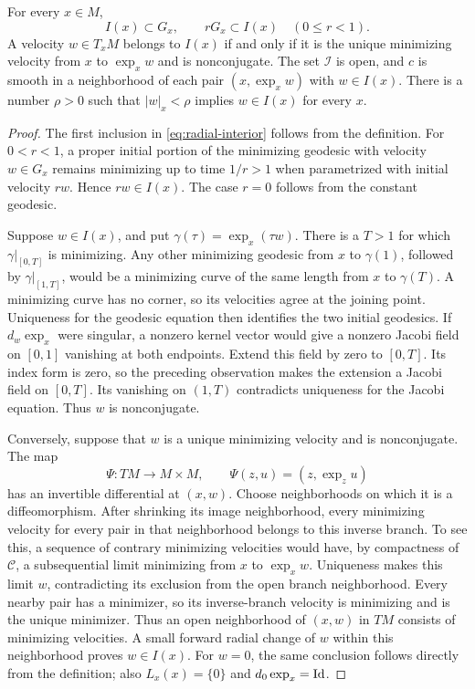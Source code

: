 \begin{lemma}
\label{lem:interior-characterization}
For every $x\in M$,
\begin{equation}
 I(x)\subset G_x,\qquad rG_x\subset I(x)\quad(0\leq r<1).
 \label{eq:radial-interior}
\end{equation}
A velocity $w\in T_xM$ belongs to $I(x)$ if and only if it is the
unique minimizing velocity from $x$ to $\exp_x w$ and is nonconjugate.
The set $\mathcal I$ is open, and $c$ is smooth in a neighborhood of
each pair $(x,\exp_x w)$ with $w\in I(x)$.  There is a number
$\rho>0$ such that $|w|_x<\rho$ implies $w\in I(x)$ for every $x$.
\end{lemma}

\begin{proof}
The first inclusion in \eqref{eq:radial-interior} follows from the
definition.  For $0<r<1$, a proper initial portion of the minimizing
geodesic with velocity $w\in G_x$ remains minimizing up to time
$1/r>1$ when parametrized with initial velocity $rw$.  Hence
$rw\in I(x)$.  The case $r=0$ follows from the constant geodesic.

Suppose $w\in I(x)$, and put $\gamma(\tau)=\exp_x(\tau w)$.
There is a $T>1$ for which $\gamma|_{[0,T]}$ is minimizing.
Any other minimizing geodesic from $x$ to $\gamma(1)$, followed by
$\gamma|_{[1,T]}$, would be a minimizing curve of the same length
from $x$ to $\gamma(T)$.  A minimizing curve has no corner, so its
velocities agree at the joining point.  Uniqueness for the geodesic
equation then identifies the two initial geodesics.
If $d_w\exp_x$ were singular, a nonzero kernel vector would give a
nonzero Jacobi field on $[0,1]$ vanishing at both endpoints.
Extend this field by zero to $[0,T]$.  Its index form is zero, so the
preceding observation makes the extension a Jacobi field on $[0,T]$.
Its vanishing on $(1,T)$ contradicts uniqueness for the Jacobi equation.
Thus $w$ is nonconjugate.

Conversely, suppose that $w$ is a unique minimizing velocity and is
nonconjugate.  The map
\begin{equation}
 \Psi:TM\longrightarrow M\times M,
 \qquad \Psi(z,u)=(z,\exp_z u)
 \label{eq:exponential-pair-map}
\end{equation}
has an invertible differential at $(x,w)$.  Choose neighborhoods on
which it is a diffeomorphism.  After shrinking its image neighborhood,
every minimizing velocity for every pair in that neighborhood belongs
to this inverse branch.  To see this, a sequence of contrary minimizing
velocities would have, by compactness of $\mathcal C$, a subsequential
limit minimizing from $x$ to $\exp_x w$.  Uniqueness makes this limit
$w$, contradicting its exclusion from the open branch neighborhood.
Every nearby pair has a minimizer, so its inverse-branch velocity is
minimizing and is the unique minimizer.  Thus an open neighborhood of
$(x,w)$ in $TM$ consists of minimizing velocities.  A small forward
radial change of $w$ within this neighborhood proves $w\in I(x)$.
For $w=0$, the same conclusion follows directly from the definition;
also $L_x(x)=\{0\}$ and $d_0\exp_x=\mathrm{Id}$.


\end{proof}
